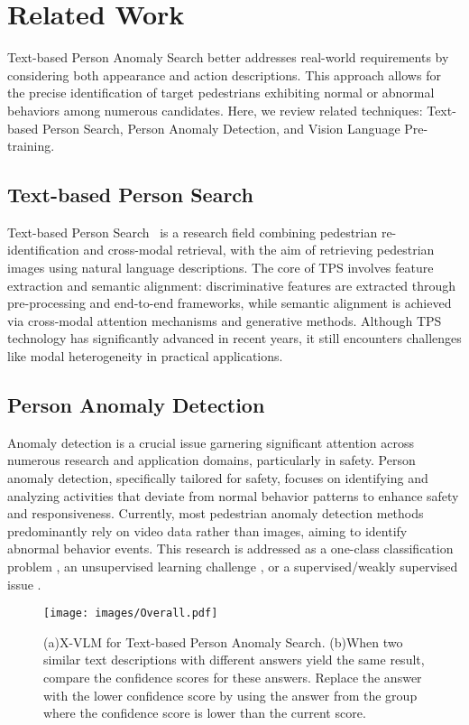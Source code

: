 \section{Related Work}
\label{sec:realted work}
Text-based Person Anomaly Search better addresses real-world requirements by considering both appearance and action descriptions. This approach allows for the precise identification of target pedestrians exhibiting normal or abnormal behaviors among numerous candidates. Here, we review related techniques: Text-based Person Search, Person Anomaly Detection, and Vision Language Pre-training.

\subsection{Text-based Person Search}
Text-based Person Search~\cite{li2017person,zhang2018deep,niu2020improving} is a research field combining pedestrian re-identification and cross-modal retrieval, with the aim of retrieving pedestrian images using natural language descriptions. The core of TPS involves feature extraction and semantic alignment: discriminative features are extracted through pre-processing and end-to-end frameworks, while semantic alignment is achieved via cross-modal attention mechanisms and generative methods. Although TPS technology has significantly advanced in recent years, it still encounters challenges like modal heterogeneity in practical applications.

\subsection{Person Anomaly Detection}
Anomaly detection is a crucial issue garnering significant attention across numerous research and application domains, particularly in safety. Person anomaly detection, specifically tailored for safety, focuses on identifying and analyzing activities that deviate from normal behavior patterns to enhance safety and responsiveness. Currently, most pedestrian anomaly detection methods predominantly rely on video data rather than images, aiming to identify abnormal behavior events. This research is addressed as a one-class classification problem \cite{feng2021convolutional, flaborea2023multimodal, hirschorn2023normalizing, zaheer2022generative}, an unsupervised learning challenge \cite{zaheer2022generative}, or a supervised/weakly supervised issue \cite{zaheer2022generative, acsintoae2022ubnormal}.

\begin{figure*}[tbh]
  \centering
  \texttt{[image: images/Overall.pdf]}
  \caption{(a)X-VLM for Text-based Person Anomaly Search. (b)When two similar text descriptions with different answers yield the same result, compare the confidence scores for these answers. Replace the answer with the lower confidence score by using the answer from the group where the confidence score is lower than the current score.}
  \label{fig: Overall}
\end{figure*}

